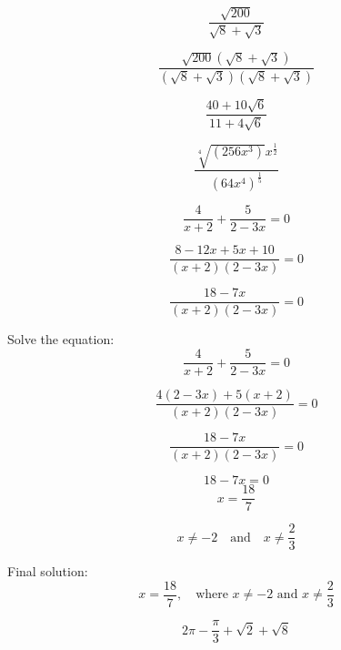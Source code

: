 \documentclass[a4paper]{tufte-handout}
\begin{document}
\[\frac{\sqrt{200}}{\sqrt{8}+\sqrt{3}}\]

\[\frac{\sqrt{200}(\sqrt{8}+\sqrt{3})}{(\sqrt{8}+\sqrt{3})(\sqrt{8}+\sqrt{3})}\]

\[\frac{40+10\sqrt{6}}{11+4\sqrt{6}}\]

\[\frac{\sqrt[4]{(256x^3)}x^{\frac{1}{2}}}{(64x^4)^\frac{1}{5}}\]


\[\frac{4}{x+2}+\frac{5}{2-3x}=0\]

\[\frac{8-12x+5x+10}{(x+2)(2-3x)}=0\]

\[\frac{18-7x}{(x+2)(2-3x)}=0\]



Solve the equation:
\[
\frac{4}{x+2}+\frac{5}{2-3x}=0
\]


\[
\frac{4(2-3x) + 5(x+2)}{(x+2)(2-3x)} = 0
\]

\[
\frac{18 - 7x}{(x+2)(2-3x)} = 0
\]


\[
18 - 7x = 0
\]
\[
x = \frac{18}{7}
\]

\[
x \neq -2 \quad \text{and} \quad x \neq \frac{2}{3}
\]

Final solution:
\[
x = \frac{18}{7}, \quad \text{where } x \neq -2 \text{ and } x \neq \frac{2}{3}
\]


\[2\pi -\frac{\pi}{3}+\sqrt{2}+\sqrt{8}\]
\end{document}
